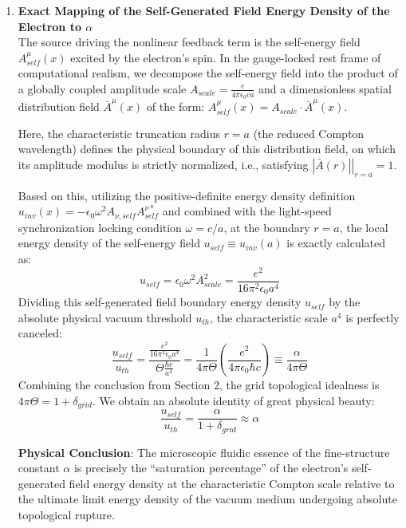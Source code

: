 \documentclass[12pt, a4paper]{article}
\begin{document}
\begin{enumerate}
    \item \textbf{Exact Mapping of the Self-Generated Field Energy Density of the Electron to $\alpha$} \\
    The source driving the nonlinear feedback term is the self-energy field $A^\mu_{self}(x)$ excited by the electron's spin. In the gauge-locked rest frame of computational realism, we decompose the self-energy field into the product of a globally coupled amplitude scale $A_{scale} = \frac{e}{4\pi\epsilon_0 c a}$ and a dimensionless spatial distribution field $\bar{A}^\mu(x)$ of the form: $A^\mu_{self}(x) = A_{scale} \cdot \bar{A}^\mu(x)$.
    
    Here, the characteristic truncation radius $r = a$ (the reduced Compton wavelength) defines the physical boundary of this distribution field, on which its amplitude modulus is strictly normalized, i.e., satisfying $\left. |\bar{A}(r)| \right|_{r=a} = 1$.
    
    Based on this, utilizing the positive-definite energy density definition $u_{inv}(x) = -\epsilon_0 \omega^2 A_{\nu, self} A^{\nu *}_{self}$ and combined with the light-speed synchronization locking condition $\omega = c/a$, at the boundary $r = a$, the local energy density of the self-energy field $u_{self} \equiv u_{inv}(a)$ is exactly calculated as:
    \begin{equation}
    u_{self} = \epsilon_0 \omega^2 A_{scale}^2 = \frac{e^2}{16\pi^2 \epsilon_0 a^4}
    \end{equation}
    Dividing this self-generated field boundary energy density $u_{self}$ by the absolute physical vacuum threshold $u_{th}$, the characteristic scale $a^4$ is perfectly canceled:
    \begin{equation}
    \frac{u_{self}}{u_{th}} = \frac{\frac{e^2}{16\pi^2 \epsilon_0 a^4}}{\Theta \frac{\hbar c}{a^4}} = \frac{1}{4\pi \Theta} \left( \frac{e^2}{4\pi\epsilon_0\hbar c} \right) \equiv \frac{\alpha}{4\pi \Theta}
    \end{equation}
    Combining the conclusion from Section 2, the grid topological idealness is $4\pi\Theta = 1 + \delta_{grid}$. We obtain an absolute identity of great physical beauty:
    \begin{equation}
    \frac{u_{self}}{u_{th}} = \frac{\alpha}{1 + \delta_{grid}} \approx \alpha
    \end{equation}
    
    \textbf{Physical Conclusion}: The microscopic fluidic essence of the fine-structure constant $\alpha$ is precisely the ``saturation percentage'' of the electron's self-generated field energy density at the characteristic Compton scale relative to the ultimate limit energy density of the vacuum medium undergoing absolute topological rupture.
    

\end{enumerate}
\end{document}
